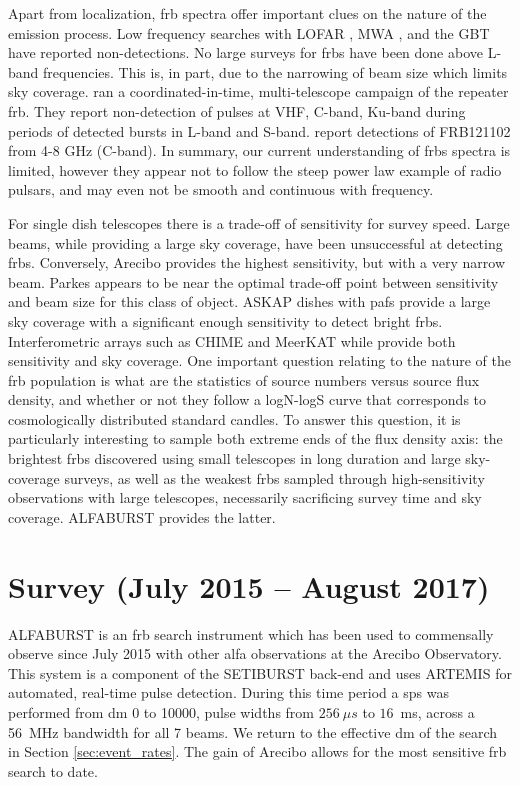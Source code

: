 \documentclass[a4paper,fleqn,usenatbib]{mnras}
\begin{document}
Apart from localization, \gls{frb} spectra offer important clues on
the nature of the emission process. Low frequency searches with LOFAR
\citep{2015MNRAS.452.1254K}, MWA \citep{2015AJ....150..199T}, and the
GBT \citep{2017arXiv170107457C} have reported non-detections.  No
large surveys for \glspl{frb} have been done above L-band
frequencies. This is, in part, due to the narrowing of beam size which
limits sky coverage.  \cite{2017arXiv170507553L} ran a
coordinated-in-time, multi-telescope campaign of the repeater
\gls{frb}.  They report non-detection of pulses at VHF, C-band,
Ku-band during periods of detected bursts in L-band and
S-band. \cite{atel10675} report detections of FRB121102 from 4-8 GHz
(C-band). In summary, our current understanding of \glspl{frb} spectra
is limited, however they appear not to follow the steep power law
example of radio pulsars, and may even not be smooth and continuous
with frequency.

For single dish telescopes there is a trade-off of sensitivity for
survey speed.  Large beams, while providing a large sky coverage, have
been unsuccessful at detecting \glspl{frb}. Conversely, Arecibo
provides the highest sensitivity, but with a very narrow beam. Parkes
appears to be near the optimal trade-off point between sensitivity and
beam size for this class of object. ASKAP dishes with \glspl{paf}
provide a large sky coverage with a significant enough sensitivity to
detect bright \glspl{frb}. Interferometric arrays such as CHIME and
MeerKAT while provide both sensitivity and sky coverage. One important
question relating to the nature of the \gls{frb} population is what
are the statistics of source numbers versus source flux density, and
whether or not they follow a logN-logS curve that corresponds to
cosmologically distributed standard candles. To answer this question,
it is particularly interesting to sample both extreme ends of the flux
density axis: the brightest \glspl{frb} discovered using small
telescopes in long duration and large sky-coverage surveys, as well as
the weakest \glspl{frb} sampled through high-sensitivity observations
with large telescopes, necessarily sacrificing survey time and sky
coverage. ALFABURST provides the latter.

\section{Survey (July 2015 -- August 2017)}
\label{sec:overview}

ALFABURST is an \gls{frb} search instrument which has been used to
commensally observe since July 2015 with other \gls{alfa} observations
at the Arecibo Observatory. This system is a component of the
SETIBURST back-end \citep{2017ApJS..228...21C} and uses ARTEMIS
\citep{2015MNRAS.452.1254K} for automated, real-time pulse
detection. During this time period a \gls{sps} was performed from
\gls{dm} 0 to 10000, pulse widths from $256~\mu s$ to $16$~ms,
across a 56~MHz bandwidth for all 7 beams. We return to the effective
\gls{dm} of the search in Section \ref{sec:event_rates}. The gain of
Arecibo allows for the most sensitive \gls{frb} search to date.
\end{document}
